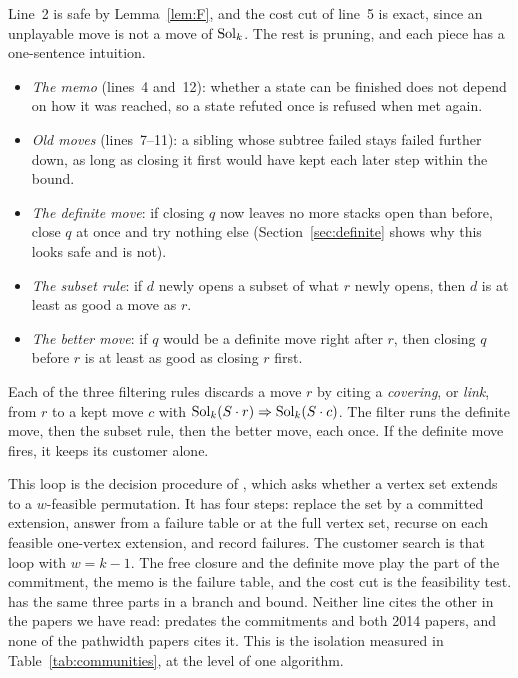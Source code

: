 Line~2 is safe by Lemma~\ref{lem:F}, and the cost cut of line~5 is exact,
since an unplayable move is not a move of $\mathrm{Sol}_k$. The rest is pruning, and
each piece has a one-sentence intuition.
\begin{itemize}
\item \emph{The memo} (lines~4 and~12): whether a state can be finished does
  not depend on how it was reached, so a state refuted once is refused when
  met again.
\item \emph{Old moves} (lines~7--11): a sibling whose subtree failed stays
  failed further down, as long as closing it first would have kept each later
  step within the bound.
\item \emph{The definite move}: if closing $q$ now leaves no more stacks open
  than before, close $q$ at once and try nothing else
  (Section~\ref{sec:definite} shows why this looks safe and is not).
\item \emph{The subset rule}: if $d$ newly opens a subset of what $r$ newly
  opens, then $d$ is at least as good a move as $r$.
\item \emph{The better move}: if $q$ would be a definite move right after $r$,
  then closing $q$ before $r$ is at least as good as closing $r$ first.
\end{itemize}
Each of the three filtering rules discards a move $r$ by citing a
\emph{covering}, or \emph{link}, from $r$ to a kept move $c$ with
$\mathrm{Sol}_k(S\cdot r)\Rightarrow\mathrm{Sol}_k(S\cdot c)$. The filter runs the definite
move, then the subset rule, then the better move, each once. If the definite
move fires, it keeps its customer alone.

This loop is the decision procedure of \citet[Algorithm~1,
p.~393]{KobayashiKomuroTamaki2014}, which asks whether a vertex set extends to
a $w$-feasible permutation. It has four steps: replace the set by a committed extension, answer
from a failure table or at the full vertex set, recurse on each feasible
one-vertex extension, and record failures. The customer search is that loop
with $w=k-1$. The free closure and the definite move play the part of the
commitment, the memo is the failure table, and the cost cut is the feasibility
test. \citet[\S3.2]{CoudertMazauricNisse2014} has the same three parts in a
branch and bound. Neither line cites the other in the papers we have read:
\citet{ChuStuckey2009} predates the commitments and both 2014 papers, and none
of the pathwidth papers cites it. This is the isolation measured in
Table~\ref{tab:communities}, at the level of one algorithm.

